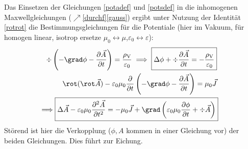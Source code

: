Das Einsetzen der Gleichungen \ref{potadef} und \ref{potsdef} in die inhomogenen Maxwellgleichungen ($\nearrow$\ref{durchf}\ref{gauss}) ergibt unter Nutzung der Identität \ref{rotrot} die Bestimmungsgleichungen für die Potentiale (hier im Vakuum, für homogen linear, isotrop ersetze $\mu_{0}\leftrightarrow\mu$,$\varepsilon_{0}\leftrightarrow\varepsilon$):        
\begin{align}
	\div\left(-\grad \phi-\frac{\partial \vec{{A}}}{\partial {t}}\right)=\frac{\rho_\text{V}}{\varepsilon_{0}} \implies \boxed{ \Delta \phi+\div \frac{\partial \vec{{A}}}{\partial {t}}=-\frac{\rho_\text{V}}{\varepsilon_{0}} } \label{bestphi}\\
	\rot(\rot \vec{{A}})-\varepsilon_{0} \mu_{0} \frac{\partial}{\partial {t}}\left(-\grad \phi-\frac{\partial \vec{{A}}}{\partial {t}}\right)=\mu_{0} \vec{{J}} \nonumber\\
	\implies \Aboxed{ \Delta \vec{{A}}-\varepsilon_{0} \mu_{0} \frac{\partial^{2} \vec{{A}}}{\partial {t}^{2}}=-\mu_{0} \vec{{J}}+\grad\left(\varepsilon_{0} \mu_{0} \frac{\partial \phi}{\partial {t}}+\div \vec{{A}}\right) } \label{besta}
\end{align}
Störend ist hier die Verkopplung ($\phi,A$ kommen in einer Gleichung vor) der beiden Gleichungen. Dies führt zur Eichung.

